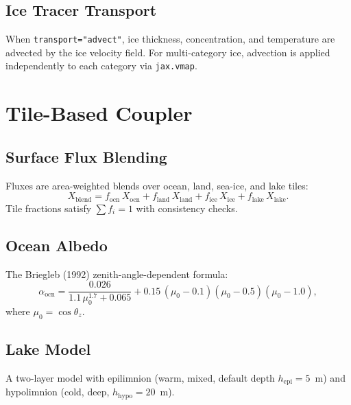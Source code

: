 \documentclass[11pt,twoside]{report}
\begin{document}
\section{Ice Tracer Transport}

When \texttt{transport="advect"}, ice thickness, concentration, and temperature are advected by the ice velocity field.  For multi-category ice, advection is applied independently to each category via \texttt{jax.vmap}.


\chapter{Tile-Based Coupler}
\label{ch:coupler}

\section{Surface Flux Blending}

Fluxes are area-weighted blends over ocean, land, sea-ice, and lake tiles:
\begin{equation}
  X_{\mathrm{blend}} = f_{\mathrm{ocn}}\,X_{\mathrm{ocn}}
  + f_{\mathrm{land}}\,X_{\mathrm{land}}
  + f_{\mathrm{ice}}\,X_{\mathrm{ice}}
  + f_{\mathrm{lake}}\,X_{\mathrm{lake}}.
\end{equation}
Tile fractions satisfy $\sum f_i = 1$ with consistency checks.

\section{Ocean Albedo}

The Briegleb (1992) zenith-angle-dependent formula:
\begin{equation}
  \alpha_{\mathrm{ocn}} = \frac{0.026}{1.1\,\mu_0^{1.7}+0.065}
  + 0.15\,(\mu_0-0.1)(\mu_0-0.5)(\mu_0-1.0),
\end{equation}
where $\mu_0=\cos\theta_z$.

\section{Lake Model}

A two-layer model with epilimnion (warm, mixed, default depth $h_{\mathrm{epi}}=5$~m)
and hypolimnion (cold, deep, $h_{\mathrm{hypo}}=20$~m).
\end{document}
